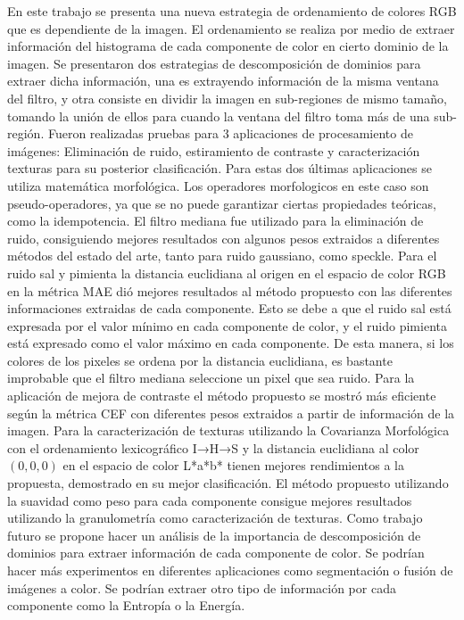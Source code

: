 En este trabajo se presenta una nueva estrategia de ordenamiento de colores RGB que es dependiente de la imagen. El ordenamiento se realiza por medio de extraer información del histograma de cada componente de color en cierto dominio de la imagen. Se presentaron dos estrategias de descomposición de dominios para extraer dicha información, una es extrayendo información de la misma ventana del filtro, y otra consiste en dividir la imagen en sub-regiones de mismo tamaño, tomando la unión de ellos para cuando la ventana del filtro toma más de una sub-región.
Fueron realizadas pruebas para 3 aplicaciones de procesamiento de imágenes: Eliminación de ruido, estiramiento de contraste y caracterización texturas para su posterior clasificación.  Para estas dos últimas aplicaciones se utiliza matemática morfológica. Los operadores morfologicos en este caso son pseudo-operadores, ya que se no puede garantizar ciertas propiedades teóricas, como la idempotencia. 
El filtro mediana fue utilizado para la eliminación de ruido, consiguiendo mejores resultados con algunos pesos extraidos a diferentes métodos del estado del arte, tanto para ruido gaussiano, como speckle. Para el ruido sal y pimienta la distancia euclidiana al origen en el espacio de color RGB en la métrica MAE  dió mejores resultados al método propuesto con las diferentes informaciones extraidas de cada componente.  Esto se debe a que el ruido sal está expresada por el valor mínimo en cada componente de color, y el ruido pimienta está expresado como el valor máximo en cada componente. De esta manera, si los colores de los pixeles se ordena por la distancia euclidiana, es bastante improbable que el filtro mediana seleccione un pixel que sea ruido. 
Para la aplicación de mejora de contraste el método propuesto se mostró más eficiente según la métrica CEF con diferentes pesos extraidos a partir de información de la imagen. Para la caracterización de texturas utilizando la Covarianza Morfológica con el ordenamiento lexicográfico  I→H→S \cite{ortiz2004gaussian} y la distancia euclidiana al color $(0,0,0)$ en el espacio de color L*a*b* \cite{ortiz2002procesamiento} tienen mejores rendimientos a la propuesta, demostrado en su mejor clasificación. El método propuesto utilizando la suavidad como peso para cada componente  consigue mejores resultados  utilizando la granulometría como caracterización de texturas.
Como trabajo futuro se propone hacer un análisis de la importancia de descomposición de dominios para extraer información de cada componente de color. Se podrían hacer más experimentos en diferentes aplicaciones como segmentación o fusión de imágenes a color. Se podrían extraer otro tipo de información por cada componente como la Entropía o la Energía.
 


